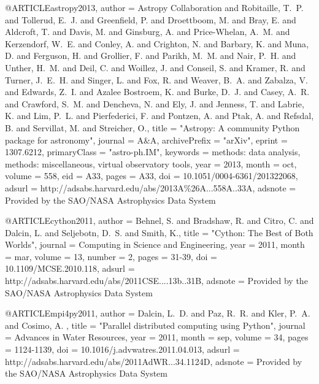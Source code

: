@ARTICLE{astropy2013,
   author = {{Astropy Collaboration} and {Robitaille}, T.~P. and {Tollerud}, E.~J. and
	{Greenfield}, P. and {Droettboom}, M. and {Bray}, E. and {Aldcroft}, T. and
	{Davis}, M. and {Ginsburg}, A. and {Price-Whelan}, A.~M. and
	{Kerzendorf}, W.~E. and {Conley}, A. and {Crighton}, N. and
	{Barbary}, K. and {Muna}, D. and {Ferguson}, H. and {Grollier}, F. and
	{Parikh}, M.~M. and {Nair}, P.~H. and {Unther}, H.~M. and {Deil}, C. and
	{Woillez}, J. and {Conseil}, S. and {Kramer}, R. and {Turner}, J.~E.~H. and
	{Singer}, L. and {Fox}, R. and {Weaver}, B.~A. and {Zabalza}, V. and
	{Edwards}, Z.~I. and {Azalee Bostroem}, K. and {Burke}, D.~J. and
	{Casey}, A.~R. and {Crawford}, S.~M. and {Dencheva}, N. and
	{Ely}, J. and {Jenness}, T. and {Labrie}, K. and {Lim}, P.~L. and
	{Pierfederici}, F. and {Pontzen}, A. and {Ptak}, A. and {Refsdal}, B. and
	{Servillat}, M. and {Streicher}, O.},
    title = "{Astropy: A community Python package for astronomy}",
  journal = {A\&A},
archivePrefix = "arXiv",
   eprint = {1307.6212},
 primaryClass = "astro-ph.IM",
 keywords = {methods: data analysis, methods: miscellaneous, virtual observatory tools},
     year = 2013,
    month = oct,
   volume = 558,
      eid = {A33},
    pages = {A33},
      doi = {10.1051/0004-6361/201322068},
   adsurl = {http://adsabs.harvard.edu/abs/2013A\%26A...558A..33A},
  adsnote = {Provided by the SAO/NASA Astrophysics Data System}
}





@ARTICLE{cython2011,
   author = {{Behnel}, S. and {Bradshaw}, R. and {Citro}, C. and {Dalcin}, L. and
	{Seljebotn}, D.~S. and {Smith}, K.},
    title = "{Cython: The Best of Both Worlds}",
  journal = {Computing in Science and Engineering},
     year = 2011,
    month = mar,
   volume = 13,
   number = 2,
    pages = {31-39},
      doi = {10.1109/MCSE.2010.118},
   adsurl = {http://adsabs.harvard.edu/abs/2011CSE....13b..31B},
  adsnote = {Provided by the SAO/NASA Astrophysics Data System}
}





@ARTICLE{mpi4py2011,
   author = {{Dalcin}, L.~D. and {Paz}, R.~R. and {Kler}, P.~A. and {Cosimo}, A.
	},
    title = "{Parallel distributed computing using Python}",
  journal = {Advances in Water Resources},
     year = 2011,
    month = sep,
   volume = 34,
    pages = {1124-1139},
      doi = {10.1016/j.advwatres.2011.04.013},
   adsurl = {http://adsabs.harvard.edu/abs/2011AdWR...34.1124D},
  adsnote = {Provided by the SAO/NASA Astrophysics Data System}
}



